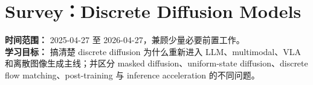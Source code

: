 
\section{Survey：Discrete Diffusion Models}

\begin{conceptbox}
\textbf{时间范围：} 2025-04-27 至 2026-04-27，兼顾少量必要前置工作。\\
\textbf{学习目标：} 搞清楚 discrete diffusion 为什么重新进入 LLM、multimodal、VLA 和离散图像生成主线；并区分 masked diffusion、uniform-state diffusion、discrete flow matching、post-training 与 inference acceleration 的不同问题。
\end{conceptbox}



